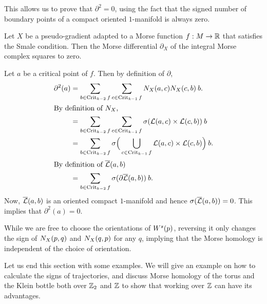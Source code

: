     This allows us to prove that $\partial^2 = 0$, using the fact that the signed number of boundary points of a compact oriented $1$-manifold is always zero.
    \begin{theorem}
        Let $X$ be a pseudo-gradient adapted to a Morse function  $f: M \to  \mathbb{R}$ that satisfies the Smale condition.
        Then the Morse differential $\partial_X$ of the integral Morse complex squares to zero.
    \end{theorem}
    \begin{myproof}
        Let $a$ be a critical point of $f$.
        Then by definition of $\partial$,
        \begin{align*}
            \partial^2(a)
            &= 
            \sum_{b \in  \operatorname{Crit}_{k-2}f}
            \sum_{c \in  \operatorname{Crit}_{k-1}f}
            N_X(a, c) N_X(c, b) \: b.\\
            \shortintertext{By definition of $N_X$,}
            &= 
            \sum_{b \in  \operatorname{Crit}_{k-2}f}
            \sum_{c \in  \operatorname{Crit}_{k-1}f}
            \sigma(\mathcal L(a, c) \times \mathcal L(c, b) )\:  b\\
            &= 
            \sum_{b \in  \operatorname{Crit}_{k-2}f}
            \sigma\Big( \bigcup_{c \in  \operatorname{Crit}_{k-1}f}
            \mathcal L(a, c) \times \mathcal L(c, b) \Big)\:  b.\\
            \shortintertext{By definition of $\overline{\mathcal L}(a, b)$}
            &= \sum_{b \in  \operatorname{Crit}_{k-2}f} \sigma(\partial \overline{\mathcal L}(a, b))\:  b.
        \end{align*} 
        Now, $\overline{\mathcal L}(a, b)$ is an oriented compact  $1$-manifold and hence $\sigma(\overline{\mathcal L}(a, b)) = 0$.
        This implies that $\partial^2(a) = 0$.
    \end{myproof}
    \begin{remark}
        While we are free to choose the orientations of $W^s(p)$, reversing it only changes the sign of $N_{X}(p, q)$ and  $N_{X}(q, p)$ for any $q$, implying that the Morse homology is independent of the choice of orientation.
    \end{remark}


    Let us end this section with some examples.
    We will give an example on how to calculate the signs of trajectories, and discuss Morse homology of the torus and the Klein bottle both over $ \mathbb{Z}_2$ and $\mathbb{Z}$ to show that working over $ \mathbb{Z}$ can have its advantages.

